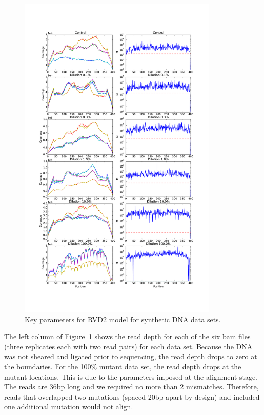 \documentclass[11pt,reqno]{amsart}
\begin{document}
\begin{figure}[htbp]
\begin{center}
\includegraphics[width=0.85\textwidth]{pdf_figs/depthM.pdf}
\caption{Key parameters for RVD2 model for synthetic DNA data sets.}
\label{fig:depthM}
\end{center}
\end{figure}

The left column of Figure~\ref{fig:depthM} shows the read depth for each of the six bam files (three replicates each with two read pairs) for each data set. Because the DNA was not sheared and ligated prior to sequencing, the read depth drops to zero at the boundaries. For the 100\% mutant data set, the read depth drops at the mutant locations. This is due to the parameters imposed at the alignment stage. The reads are 36bp long and we required no more than 2 mismatches. Therefore, reads that overlapped two mutations (spaced 20bp apart by design) and included one additional mutation would not align.
\end{document}
